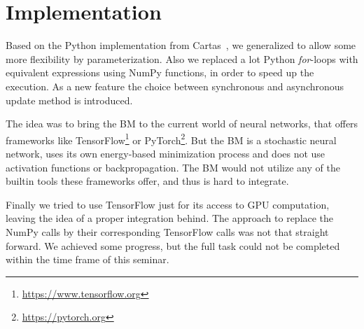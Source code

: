 \documentclass[12pt,twoside]{article}
\theoremstyle{plain}
\theoremstyle{definition}
\theoremstyle{remark}
\begin{document}
\section{Implementation}
\label{sec:impl}

Based on the Python implementation from Cartas~\cite{BMImpl}, we generalized to allow some more flexibility by parameterization. Also we replaced a lot Python \textit{for}-loops with equivalent expressions using NumPy functions, in order to speed up the execution. As a new feature the choice between synchronous and asynchronous update method is introduced.

The idea was to bring the BM to the current world of neural networks, that offers frameworks like TensorFlow\footnote{\url{https://www.tensorflow.org}} or PyTorch\footnote{\url{https://pytorch.org}}. But the BM is a stochastic neural network, uses its own energy-based minimization process and does not use activation functions or backpropagation. The BM would not utilize any of the builtin tools these frameworks offer, and thus is hard to integrate. 

Finally we tried to use TensorFlow just for its access to GPU computation, leaving the idea of a proper integration behind. The approach to replace the NumPy calls by their corresponding TensorFlow calls was not that straight forward. We achieved some progress, but the full task could not be completed within the time frame of this seminar.\newline
\end{document}
